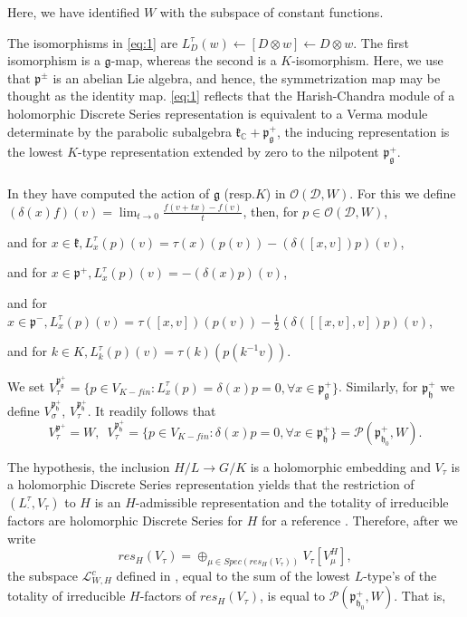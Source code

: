 \documentclass[12pt]{amsart}
\theoremstyle{definition}
\theoremstyle{remark}
\newcommand{\g}{\mathfrak{g}}
\newcommand{\h}{\mathfrak{h}}
\renewcommand{\k}{{\mathfrak k}}
\newcommand{\p}{\mathfrak p}
\newcommand{\C}{{\mathbb C}}
\numberwithin{equation}{section}
\begin{document}
 Here, we have identified $W$ with the subspace of constant functions.

 The isomorphisms in \ref{eq:1} are $L_D^\tau (w)\leftarrow [D\otimes w] \leftarrow D\otimes w$.
The first isomorphism is a $\g$-map, whereas the second is a $K$-isomorphism.
 Here, we use that $\mathfrak p^\pm$ is an abelian Lie algebra, and hence, the symmetrization map may be thought as the identity map. \ref{eq:1} reflects that the Harish-Chandra module of a holomorphic Discrete Series representation is equivalent to a Verma module determinate by the parabolic subalgebra $\k_\C +\p_\g^+$, the inducing representation is the lowest $K$-type representation extended by zero to the nilpotent $\p_\g^+$.




  \subsubsection{}\label{sub:jv} In  \cite{JV} \cite{FOO}  they have computed the action of $\mathfrak g$ (resp.$K$) in $\mathcal O(\mathcal D,W)$. For this we define $(\delta(x)f)(v)=\lim_{t\rightarrow 0} \frac{ f(v+tx)-f(v)}{t}$, then, for $p\in \mathcal O(\mathcal D,W)$,

 and for $x\in \mathfrak k, L_x^\tau(p)(v)=\tau (x)(p(v))-(\delta([x,v]) p)(v)$,

 and for $x \in \mathfrak p^+, L_x^\tau(p)(v)=-(\delta(x) p)(v)$,

 and for $x \in \mathfrak p^-, L_x^\tau(p)(v)=\tau([x,v])(p(v))-\frac12(\delta([[x,v],v]) p)(v)$,

 and for $k \in K, L_k^\tau (p)(v)=\tau(k)(p(k^{-1}v))$.

We set $V_\tau^{\mathfrak p_\g^+}=\{p \in V_{K-fin}: L_x^\tau(p)=\delta(x)p=0, \forall x \in \mathfrak p_\mathfrak g^+ \}$. Similarly, for $\p_\h^+$  we define $V_\sigma^{\p_\h^+}$, $V_\tau^{\mathfrak p_{\h}^+ }$.
 It readily follows that \begin{equation*}V_\tau^{\mathfrak p^+}=W , \,\,\, V_\tau^{\mathfrak p_\mathfrak h^+}=\{p \in V_{K-fin}: \delta(x)p=0, \forall x \in \mathfrak p_\mathfrak h^+ \}=\mathcal P(\mathfrak p_{\mathfrak h_0}^+,W).\end{equation*}

 \smallskip
 The hypothesis, the inclusion $H/L \rightarrow G/K$ is a holomorphic embedding and $V_\tau$ is a holomorphic Discrete Series  representation  yields that the restriction of $(L_\cdot^\tau , V_\tau)$ to $H$ is an $H$-admissible representation and the  totality of irreducible factors are holomorphic Discrete Series for $H$ for a reference \cite{Kob9}. Therefore, after we write $$res_H(V_\tau)=\oplus_{\mu \in Spec(res_H(V_\tau))} V_\tau[V_\mu^H],$$  the subspace $\mathcal L_{W,H}^c$  defined in \cite{Va}\cite{OV3},  equal to the sum   of the lowest $L$-type's of the totality of irreducible $H$-factors of $res_H(V_\tau)$, is equal to $\mathcal P(\mathfrak p_{\mathfrak h_0}^+,W)$. That is,
\end{document}

